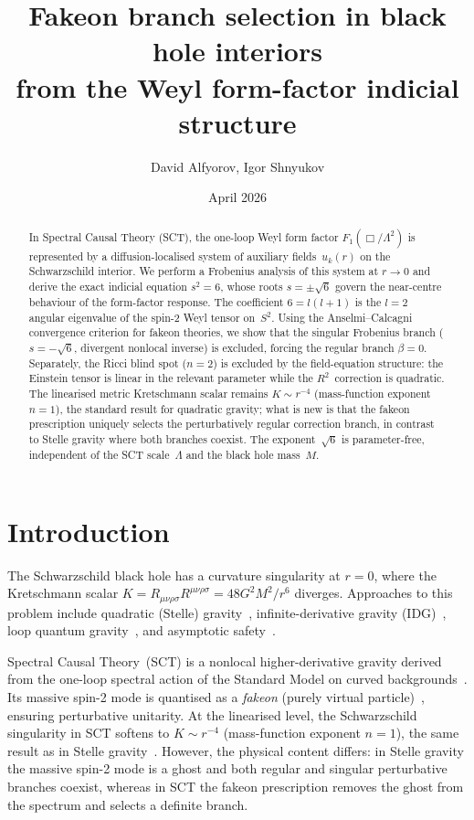 \documentclass[a4paper,12pt]{article}
\title{Fakeon branch selection in black hole interiors\\
  from the Weyl form-factor indicial structure}
\author{David Alfyorov, Igor Shnyukov}
\date{April 2026}
\newcommand{\Lam}{\Lambda}
\begin{document}
\maketitle

\begin{abstract}
In Spectral Causal Theory (SCT), the one-loop Weyl form factor
$F_1(\Box/\Lam^2)$ is represented by a diffusion-localised system of
auxiliary fields~$u_k(r)$ on the Schwarzschild interior.
We perform a Frobenius analysis of this system at $r\to 0$ and derive
the exact indicial equation $s^2=6$, whose roots $s=\pm\sqrt{6}$
govern the near-centre behaviour of the form-factor response.
The coefficient $6=l(l+1)$ is the $l\!=\!2$ angular eigenvalue of the
spin-2 Weyl tensor on~$S^2$.
Using the Anselmi--Calcagni convergence criterion for fakeon theories,
we show that the singular Frobenius branch ($s=-\sqrt{6}$, divergent
nonlocal inverse) is excluded, forcing the regular branch $\beta=0$.
Separately, the Ricci blind spot ($n\!=\!2$) is excluded by the
field-equation structure: the Einstein tensor is linear in the relevant
parameter while the $R^2$~correction is quadratic.
The linearised metric Kretschmann scalar remains $K\sim r^{-4}$
(mass-function exponent $n=1$), the standard result for quadratic gravity;
what is new is that the fakeon prescription uniquely selects the
perturbatively regular correction branch, in contrast to Stelle gravity
where both branches coexist.
The exponent~$\sqrt{6}$ is parameter-free, independent of the SCT
scale~$\Lam$ and the black hole mass~$M$.
\end{abstract}

\tableofcontents

\section{Introduction}

The Schwarzschild black hole has a curvature singularity at $r=0$,
where the Kretschmann scalar $K=R_{\mu\nu\rho\sigma}R^{\mu\nu\rho\sigma}
=48G^2M^2/r^6$ diverges.
Approaches to this problem include quadratic (Stelle)
gravity~\cite{Stelle1977}, infinite-derivative gravity
(IDG)~\cite{Buoninfante2018}, loop quantum gravity~\cite{Ashtekar2006},
and asymptotic safety~\cite{Bonanno2000}.

Spectral Causal Theory~(SCT) is a nonlocal higher-derivative gravity
derived from the one-loop spectral action of the Standard Model on
curved backgrounds~\cite{Paper1}.
Its massive spin-2 mode is quantised as a \emph{fakeon} (purely virtual
particle)~\cite{Anselmi2018}, ensuring perturbative unitarity.
At the linearised level, the Schwarzschild singularity in SCT softens to
$K\sim r^{-4}$ (mass-function exponent $n\!=\!1$), the same result as in
Stelle gravity~\cite{LPPS2015}.
However, the physical content differs: in Stelle gravity the massive
spin-2 mode is a ghost and both regular and singular perturbative branches
coexist, whereas in SCT the fakeon prescription removes the ghost from the
spectrum and selects a definite branch.
\end{document}
